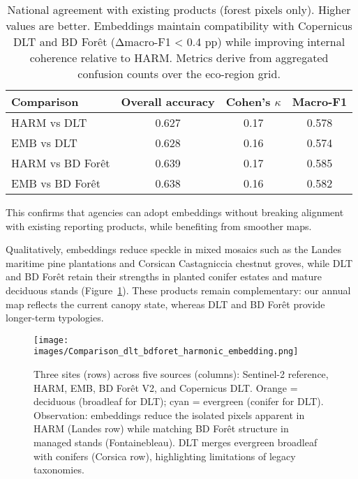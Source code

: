 \documentclass[utf8]{FrontiersinHarvard}
\begin{document}
\begin{table}[H]
    \centering
    \small
    \caption{National agreement with existing products (forest pixels only). Higher values are better. Embeddings maintain compatibility with Copernicus DLT and BD Forêt (Δmacro-F1 < 0.4 pp) while improving internal coherence relative to HARM. Metrics derive from aggregated confusion counts over the eco-region grid.}
    \begin{tabular}{lccc}
        \toprule
        \textbf{Comparison} & \textbf{Overall accuracy} & \textbf{Cohen's $\kappa$} & \textbf{Macro-F1} \\
        \midrule
        HARM vs DLT & 0.627 & 0.17 & 0.578 \\
        EMB vs DLT & 0.628 & 0.16 & 0.574 \\
        HARM vs BD Forêt & 0.639 & 0.17 & 0.585 \\
        EMB vs BD Forêt & 0.638 & 0.16 & 0.582 \\
        \bottomrule
    \end{tabular}
    \label{tab:product_comparison_national}
\end{table}

This confirms that agencies can adopt embeddings without breaking alignment with existing reporting products, while benefiting from smoother maps.

Qualitatively, embeddings reduce speckle in mixed mosaics such as the Landes maritime pine plantations and Corsican Castagniccia chestnut groves, while DLT and BD Forêt retain their strengths in planted conifer estates and mature deciduous stands (Figure~\ref{fig:comparison_products}). These products remain complementary: our annual map reflects the current canopy state, whereas DLT and BD Forêt provide longer-term typologies.

\begin{figure}[H]
    \centering
    \texttt{[image: images/Comparison\_dlt\_bdforet\_harmonic\_embedding.png]}
    \caption{Three sites (rows) across five sources (columns): Sentinel-2 reference, HARM, EMB, BD Forêt V2, and Copernicus DLT. Orange = deciduous (broadleaf for DLT); cyan = evergreen (conifer for DLT). Observation: embeddings reduce the isolated pixels apparent in HARM (Landes row) while matching BD Forêt structure in managed stands (Fontainebleau). DLT merges evergreen broadleaf with conifers (Corsica row), highlighting limitations of legacy taxonomies.}
    \label{fig:comparison_products}
\end{figure}
\end{document}
